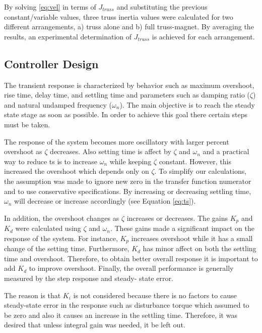 By solving \ref{eq:vel} in terms of $J_{truss}$ and substituting the previous constant/variable values, three truss inertia values were calculated for two different arrangements, a) truss alone and b) full truss-magnet. By averaging the results, an experimental determination of $J_{truss}$ is achieved for each arrangement.

\subsection{Controller Design}

The transient response is characterized by behavior such as maximum overshoot, rise time, delay time, and settling time and parameters such as damping ratio ($\zeta$) and natural undamped frequency ($\omega_n$). 
The main objective is to reach the steady state stage as soon as possible. In order to achieve this goal there certain steps must be taken.

The response of the system becomes more oscillatory with larger percent overshoot as $\zeta$ decreases. 
Also setting time is affect by $\zeta$ and $\omega_n$ and a practical way to reduce ts is to increase $\omega_n$ while keeping $\zeta$ constant. 
However, this increased the overshoot which depends only on $\zeta$. 
To simplify our calculations, the assumption was made to ignore new zero in the transfer function numerator and to use conservative specifications.  %
By increasing or decreasing settling time, $\omega_n$ will decrease or increase accordingly (see Equation \ref{eq:ts}).

In addition, the overshoot changes as $\zeta$ increases or decreases. 
The gains $K_p$ and $K_d$ were calculated using $\zeta$ and $\omega_n$. 
These gains made a significant impact on the response of the system. 
For instance, $K_p$ increases overshoot while it has a small change of the setting time. 
Furthermore, $K_d$ has minor affect on both the settling time and overshoot. 
Therefore, to obtain better overall response it is important to add $K_d$ to improve overshoot.
Finally, the overall performance is generally measured by the step response and steady- state error.

The reason is that $K_i$ is not considered because there is no factors to cause steady-state error in the response such as disturbance torque which assumed to be zero and also it causes an increase in the settling time. 
Therefore, it was desired that unless integral gain was needed, it be left out.



